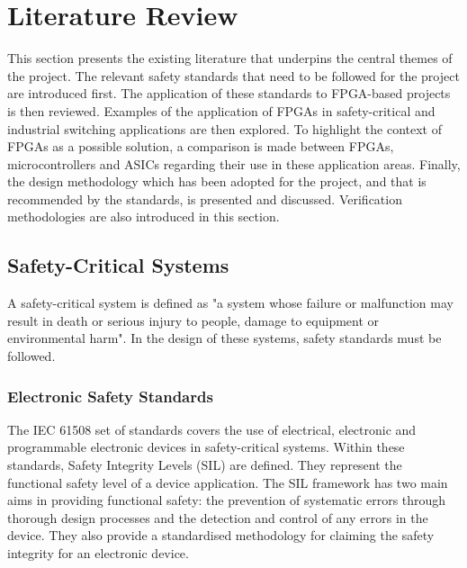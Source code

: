 \chapter{Literature Review}
\label{litreview}

This section presents the existing literature that underpins the central themes of the project. The relevant safety standards that need to be followed for the project are introduced first. The application of these standards to FPGA-based projects is then reviewed. Examples of the application of FPGAs in safety-critical and industrial switching applications are then explored. To highlight the context of FPGAs as a possible solution, a comparison is made between FPGAs, microcontrollers and ASICs regarding their use in these application areas. 
Finally, the design methodology which has been adopted for the project, and that is recommended by the standards, is presented and discussed. Verification methodologies are also introduced in this section.

\section{Safety-Critical Systems}
A safety-critical system is defined as "a system whose failure or malfunction may result in death or serious injury to people, damage to equipment or environmental harm"\cite{Bernardeschi}. In the design of these systems, safety standards must be followed\cite{Bernardeschi, HayekSRAM, HayekSafety}.

\subsection{Electronic Safety Standards}
The IEC 61508 set of standards covers the use of electrical, electronic and programmable electronic devices in safety-critical systems\cite{IEC61508}. Within these standards, Safety Integrity Levels (SIL) are defined. They represent the functional safety level of a device application. The SIL framework has two main aims in providing functional safety: the prevention of systematic errors through thorough design processes and the detection and control of any errors in the device\cite{IEC61508}. They also provide a standardised methodology for claiming the safety integrity for an electronic device\cite{Redmill, Borcsok}. 

